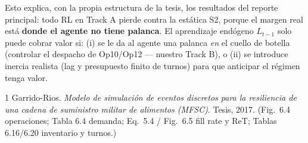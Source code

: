 \documentclass[11pt,a4paper]{article}
\newcommand{\bad}[1]{\textcolor{red!65!black}{\textbf{#1}}}
\begin{document}
\medskip
\noindent Esto explica, con la propia estructura de la tesis, los resultados del reporte
principal: todo RL en Track A pierde contra la estática S2, porque el margen real
está \bad{donde el agente no tiene palanca}. El aprendizaje endógeno $L_{t-1}$ solo
puede cobrar valor si: (i) se le da al agente una palanca \emph{en} el cuello de botella
(controlar el despacho de Op10/Op12 --- nuestro Track B), o (ii) se introduce inercia
realista (lag y presupuesto finito de turnos) para que anticipar el régimen tenga valor.

\begin{thebibliography}{1}
 Garrido-Rios. \emph{Modelo de simulación de eventos discretos para
la resiliencia de una cadena de suministro militar de alimentos (MFSC)}. Tesis, 2017.
(Fig.\ 6.4 operaciones; Tabla 6.4 demanda; Eq.\ 5.4 / Fig.\ 6.5 fill rate y ReT;
Tablas 6.16/6.20 inventario y turnos.)
\end{thebibliography}
\end{document}
